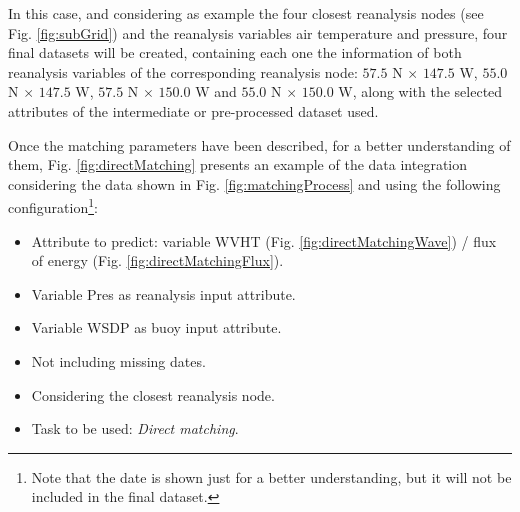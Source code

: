 \documentclass[energies,article,submit,moreauthors,pdftex]{Definitions/mdpi}
\begin{document}
\begin{itemize}
\begin{itemize}
							In this case, and considering as example the four closest reanalysis nodes (see Fig. \ref{fig:subGrid}) and the reanalysis variables air temperature and pressure, four final datasets will be created, containing each one the information of both reanalysis variables of the corresponding reanalysis node: $57.5$ N $\times$ $147.5$ W, $55.0$ N $\times$ $147.5$ W, $57.5$ N $\times$ $150.0$ W and $55.0$ N $\times$ $150.0$ W, along with the selected attributes of the intermediate or pre-processed dataset used.
							
						\end{itemize}
					
				\end{itemize}
						
				Once the matching parameters have been described, for a better understanding of them,  Fig. \ref{fig:directMatching} presents an example of the data integration considering the data shown in Fig. \ref{fig:matchingProcess} and using the following configuration\footnote{Note that the date is shown just for a better understanding, but it will not be included in the final dataset.}:
					\begin{itemize}
						\item Attribute to predict: variable WVHT (Fig. \ref{fig:directMatchingWave}) / flux of energy (Fig. \ref{fig:directMatchingFlux}).
						\item Variable Pres as reanalysis input attribute.
						\item Variable WSDP as buoy input attribute.
						\item Not including missing dates.
						\item Considering the closest reanalysis node.
						\item Task to be used: \textit{Direct matching}.
					\end{itemize}
\end{document}
